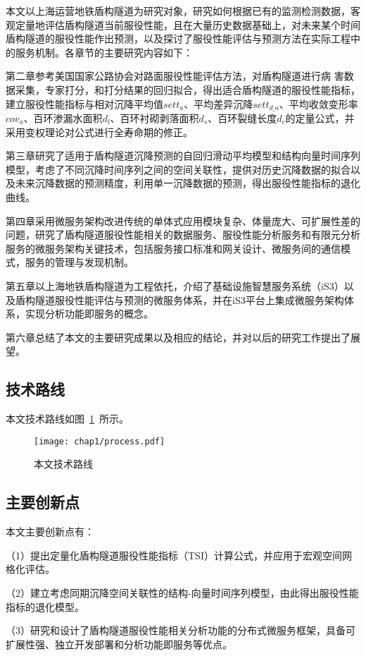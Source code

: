 本文以上海运营地铁盾构隧道为研究对象，研究如何根据已有的监测检测数据，客观定量地评估盾构隧道当前服役性能，且在大量历史数据基础上，对未来某个时间盾构隧道的服役性能作出预测，以及探讨了服役性能评估与预测方法在实际工程中的服务机制。各章节的主要研究内容如下：

第二章参考美国国家公路协会对路面服役性能评估方法，对盾构隧道进行病
害数据采集，专家打分，和打分结果的回归拟合，得出适合盾构隧道的服役性能指标，建立服役性能指标与相对沉降平均值${sett}_{a}$、平均差异沉降$set{{t}_{d\_a}}$、平均收敛变形率${cov}_{a}$、百环渗漏水面积${d}_{l}$、百环衬砌剥落面积${d}_{s}$、百环裂缝长度${d}_{c}$的定量公式，并采用变权理论对公式进行全寿命期的修正。

第三章研究了适用于盾构隧道沉降预测的自回归滑动平均模型和结构向量时间序列模型，考虑了不同沉降时间序列之间的空间关联性，提供对历史沉降数据的拟合以及未来沉降数据的预测精度，利用单一沉降数据的预测，得出服役性能指标的退化曲线。

第四章采用微服务架构改进传统的单体式应用模块复杂、体量庞大、可扩展性差的问题，研究了盾构隧道服役性能相关的数据服务、服役性能分析服务和有限元分析服务的微服务架构关键技术，包括服务接口标准和网关设计、微服务间的通信模式，服务的管理与发现机制。

第五章以上海地铁盾构隧道为工程依托，介绍了基础设施智慧服务系统（iS3）以及盾构隧道服役性能评估与预测的微服务体系，并在iS3平台上集成微服务架构体系，实现分析功能即服务的概念。

第六章总结了本文的主要研究成果以及相应的结论，并对以后的研究工作提出了展望。 

\subsection{技术路线}

本文技术路线如图~\ref{fig:本文技术路线}~所示。

\begin{figure}[htb!]
    \centering
    \texttt{[image: chap1/process.pdf]}
    \caption{本文技术路线}
    \label{fig:本文技术路线}
\end{figure}

\subsection{主要创新点}

本文主要创新点有：

（1）提出定量化盾构隧道服役性能指标（TSI）计算公式，并应用于宏观空间网格化评估。

（2）建立考虑同期沉降空间关联性的结构-向量时间序列模型，由此得出服役性能指标的退化模型。

（3）研究和设计了盾构隧道服役性能相关分析功能的分布式微服务框架，具备可扩展性强、独立开发部署和分析功能即服务等优点。